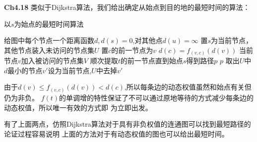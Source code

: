 \documentclass{article}
\begin{document}
\textbf{Ch4.18}
类似于Dijkstra算法，我们给出确定从始点到目的地的最短时间的算法：
\begin{algorithm}
\caption{以$s$为始点的最短时间算法}
\begin{algorithmic}[1]
\STATE 给图中每个节点一个距离函数$d$,$\,d(s)=0$,对其他点$d(u)=\infty$
\STATE 置$s$为当前节点，其他节点装入未访问的节点集$U$
\STATE 置$c$的前一节点为$v$
\STATE $d(c)=f_{(v,c)}(d(v))$
\ENDIF
\ENDFOR
\STATE 当前节点$v$加入被访问的节点集$V$
\STATE 顺次提取$t$的前一节点直到始点$s$得到路径$p$
\RETURN $p$
\ELSE 
\STATE 取出$U$中$d$最小的节点$v'$设为当前节点,$U$中去掉$v'$
\ENDIF
\end{algorithmic}
\end{algorithm}

由于$d(v)\leq f_{(v,c)}(d(v))<d(c)$,所以每条边的动态权值虽然和始点有关但仍为非负。
$f(t)$的单调增的特性保证了不可以通过原地等待的方式减少每条边的动态权值，所以唯一有效的方式即
为立即出发。

有了上面两点，仿照Dijkstra算法对于具有非负权值的连通图可以找到最短路径的论证过程容易说明
上面的方法对于有动态权值的图也可以给出最短时间。
\end{document}
